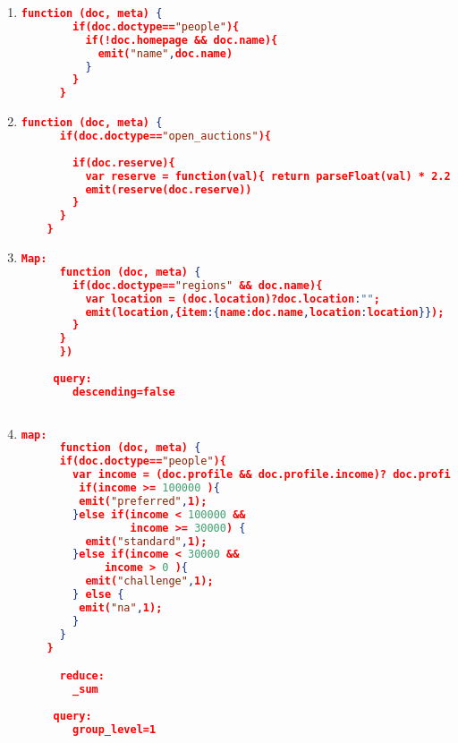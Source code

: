 \begin{enumerate}[label=Q\arabic*]
    
    \item \label{cb-q-17}%
	\begin{lstlisting}[language=JSON, basicstyle=\scriptsize]
	  function (doc, meta) {
	    if(doc.doctype=="people"){
	      if(!doc.homepage && doc.name){
	        emit("name",doc.name)
	      } 
	    }
	  }
	\end{lstlisting}	

    \item \label{cb-q-18}%
	\begin{lstlisting}[language=JSON, basicstyle=\scriptsize]
	  function (doc, meta) {
      if(doc.doctype=="open_auctions"){
        
        if(doc.reserve){
          var reserve = function(val){ return parseFloat(val) * 2.20371 }
          emit(reserve(doc.reserve))
        } 
      }
    }
	\end{lstlisting}	

    \item \label{cb-q-19}%
	\begin{lstlisting}[language=JSON, basicstyle=\scriptsize]
	Map:
	  function (doc, meta) {
	    if(doc.doctype=="regions" && doc.name){
	      var location = (doc.location)?doc.location:"";
	      emit(location,{item:{name:doc.name,location:location}});
	    }
	  }
	  })
	 
	 query: 
	    descending=false
	  
	\end{lstlisting}	
	
    \item \label{cb-q-20}%
	\begin{lstlisting}[language=JSON, basicstyle=\scriptsize]
	  map:
	  function (doc, meta) {
      if(doc.doctype=="people"){ 
        var income = (doc.profile && doc.profile.income)? doc.profile.income : 0;
         if(income >= 100000 ){
      	 emit("preferred",1);
        }else if(income < 100000 && 
                 income >= 30000) {
          emit("standard",1);
        }else if(income < 30000 &&
             income > 0 ){
          emit("challenge",1);
        } else {
         emit("na",1);
        }    
      }
    }

	  reduce:
	    _sum
	 
	 query:
	    group_level=1
	\end{lstlisting}

\end{enumerate}
